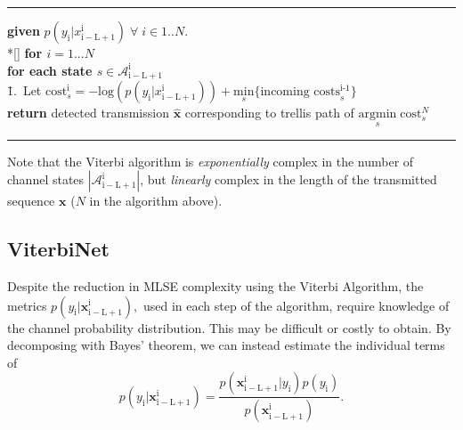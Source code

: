 \documentclass[12pt,a4paper]{report}
\begin{document}
    \noindent\rule[10pt]{\textwidth}{0.4pt}
    {\footnotesize
    \begin{tabbing}
        {\bf given} $p(y_{\mathrm{i}}|x_{\mathrm{i-L+1}}^{\mathrm{i}}) \; \forall  \;i \in {1..N}$. \\*[\smallskipamount]
        {\bf for $i = 1...N $} \\
         \qquad \= {\bf for each state $s \in \mathcal{A}_{\mathrm{i-L+1}}^{\mathrm{i}}$}\\
        \qquad \qquad \= 1.\ Let $\text{cost}_{s}^{\text{i}} = -\text{log}(p(y_{\mathrm{i}}|x_{\mathrm{i-L+1}}^{\mathrm{i}})) + \underset{s}{\text{min}} \{\text{incoming costs}_{s}^{\text{i-1}}\}$ \\
        {\bf return} detected transmission $\hat{\mathbf{x}}$ corresponding to trellis path of $\underset{s}{\text{argmin}} \; \text{cost}_{s}^N $
    \end{tabbing}}
    \noindent\rule[10pt]{\textwidth}{0.4pt}


Note that the Viterbi algorithm is \emph{exponentially} complex in the number of channel states $|\mathcal{A}_{\mathrm{i-L+1}}^{\mathrm{i}}|$, but \emph{linearly} complex in the length of the transmitted sequence $\mathbf{x}$ ($N$ in the algorithm above). 


\subsection{ViterbiNet}
Despite the reduction in MLSE complexity using the Viterbi Algorithm, the metrics $p(y_{\mathrm{i}}|\mathbf{x}_{\mathrm{i-L+1}}^{\mathrm{i}}) ,$ used in each step of the algorithm,
 require knowledge of the channel probability distribution. This may be difficult or costly to obtain. By decomposing with Bayes' theorem, we can instead estimate the individual terms of
\begin{equation*}
p(y_{\mathrm{i}}|\mathbf{x}_{\mathrm{i-L+1}}^{\mathrm{i}}) = 
\frac
{p(\mathbf{x}_{\mathrm{i-L+1}}^{\mathrm{i}}|y_{\mathrm{i}})p(y_{\mathrm{i}})}
{p(\mathbf{x}_{\mathrm{i-L+1}}^{\mathrm{i}})}.
\end{equation*}
\end{document}
